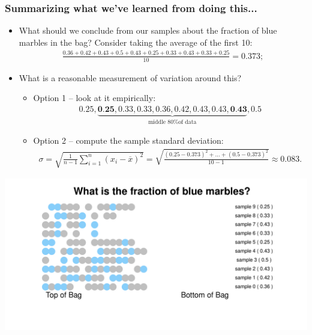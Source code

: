 \documentclass[aspectratio=169]{beamer}
\theoremstyle{principle}
\begin{document}
\begin{frame}
\frametitle{Summarizing what we've learned from doing this...}
\begin{itemize}
\item What should we conclude from our samples about the fraction of blue marbles in the bag?  Consider taking the average of the first 10:
\begin{align*}
\frac{0.36 + 0.42 + 0.43 + 0.5 + 0.43 + 0.25 + 0.33 + 0.43 + 0.33 + 0.25}{10} = 0.373;
\end{align*}
\bigskip

\item What is a reasonable measurement of variation around this?
\begin{itemize}
\item Option 1 -- look at it empirically:
\begin{align*}
0.25,\underbrace{\textbf{0.25},0.33,0.33,0.36,0.42,0.43,0.43,\textbf{0.43}}_{\mbox{middle 80\% of data}},0.5
\end{align*}
\item Option 2 -- compute the sample standard deviation:
\begin{align*}
\sigma = \sqrt{\frac{1}{n-1}\sum_{i=1}^n(x_i - \overline{x})^2} = \sqrt{\frac{(0.25 - 0.373)^2 + \hdots + (0.5 - 0.373)^2}{10 - 1}}\approx 0.083.
\end{align*}
\end{itemize}

\end{itemize}
\end{frame}


\begin{frame}
\begin{center}
\includegraphics[scale=0.57]{sample_9.pdf}
\end{center}
\end{frame}
\end{document}
